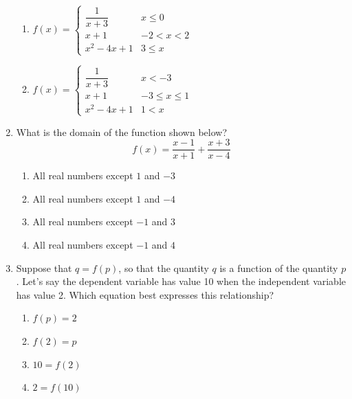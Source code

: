\documentclass{article}
\begin{document}
\begin{enumerate}
\begin{multicols}{2}
\begin{enumerate}[label=\Alph*),itemsep=5pt]
              \item $ f(x) = \begin{cases} 
                      \dfrac{1}{x+3}    & x \leq 0 \\
                      x+1               & -2 < x < 2 \\
                      x^2-4x+1          & 3 \leq x 
                      \end{cases}$ %
              \item $ f(x) = \begin{cases} 
                      \dfrac{1}{x+3}    & x < -3 \\
                      x+1               & -3\leq x \leq 1 \\
                      x^2-4x+1          & 1 < x 
                      \end{cases}$  %
            \end{enumerate}
          \end{multicols}



    \item What is the domain of the function shown below?
    \[
       f(x) = \frac{x-1}{x+1} + \frac{x+3}{x-4}
    \]
            \begin{enumerate}[label=\Alph*)]
                \item All real numbers except $1$ and $-3$
                \item All real numbers except $1$ and $-4$
                \item All real numbers except $-1$ and $3$
                \item All real numbers except $-1$ and $4$ %
            \end{enumerate}

     \item Suppose that $q = f(p)$, so that the quantity $q$ is a function of the quantity $p$. Let's say the dependent variable has value 10 when the independent variable has value 2. Which equation best expresses this relationship?

                  \begin{enumerate}[label=\Alph*)]
                      \item $f(p)=2$
                      \item $f(2)=p$
                      \item $10 = f(2)$ %
                      \item $2 = f(10)$
                      

\end{enumerate}
\end{enumerate}
\end{document}
